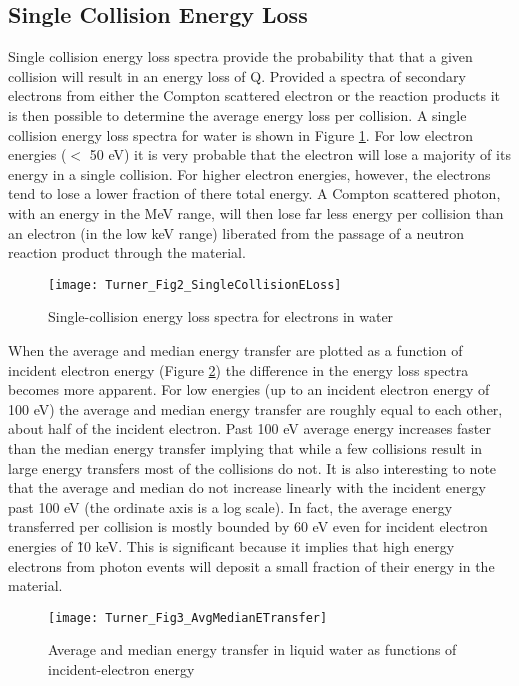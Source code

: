 \subsection{Single Collision Energy Loss}

Single collision energy loss spectra provide the probability that that a given collision will result in an energy loss of Q.
Provided a spectra of secondary electrons from either the Compton scattered electron or the  reaction products it is then possible to determine the average energy loss per collision.
A single collision energy loss spectra for water is shown in Figure \ref{fig:TurnerELoss}.
For low electron energies ($<$ 50 eV) it is very probable that the electron will lose a majority of its energy in a single collision.
For higher electron energies, however, the electrons tend to lose a lower fraction of there total energy. 
A Compton scattered photon, with an energy in the MeV range, will then lose far less energy per collision than an electron (in the low keV range) liberated from the passage of a neutron reaction product through the material.
\begin{figure}[ht]
    \centering
    \texttt{[image: Turner\_Fig2\_SingleCollisionELoss]}
    \caption{Single-collision energy loss spectra for electrons in water \protect\cite{turner_comparative_1982}}
    \label{fig:TurnerELoss}
\end{figure}
When the average and median energy transfer are plotted as a function of incident electron energy (Figure \ref{fig:TurnerETransfer}) the difference in the energy loss spectra becomes more apparent.
For low energies (up to an incident electron energy of 100 eV) the average and median energy transfer are roughly equal to each other, about half of the incident electron.
Past 100 eV average energy increases faster than the median energy transfer implying that while a few collisions result in large energy transfers most of the collisions do not.
It is also interesting to note that the average and median do not increase linearly with the incident energy past 100 eV (the ordinate axis is a log scale). 
In fact, the average energy transferred per collision is mostly bounded by 60 eV even for incident electron energies of \~10 keV.
This is significant because it implies that high energy electrons from photon events will deposit a small fraction of their energy in the material.
\begin{figure}[ht]
    \centering
    \texttt{[image: Turner\_Fig3\_AvgMedianETransfer]}
    \caption{Average and median energy transfer in liquid water as functions of incident-electron energy \protect\cite{turner_comparative_1982}}
    \label{fig:TurnerETransfer}
\end{figure}
